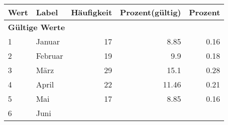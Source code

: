      \begin{longtable}{lXrrr}
     \toprule
     \textbf{Wert} & \textbf{Label} & \textbf{Häufigkeit} & \textbf{Prozent(gültig)} & \textbf{Prozent} \\
     \endhead
     \midrule
     \multicolumn{5}{l}{\textbf{Gültige Werte}}\\

     1 &
     \multicolumn{1}{X}{ Januar   } &


       \num{17} &
       \num[round-mode=places,round-precision=2]{8,85} &
         \num[round-mode=places,round-precision=2]{0,16} \\

     2 &
     \multicolumn{1}{X}{ Februar   } &


       \num{19} &
       \num[round-mode=places,round-precision=2]{9,9} &
         \num[round-mode=places,round-precision=2]{0,18} \\

     3 &
     \multicolumn{1}{X}{ März   } &


       \num{29} &
       \num[round-mode=places,round-precision=2]{15,1} &
         \num[round-mode=places,round-precision=2]{0,28} \\

     4 &
     \multicolumn{1}{X}{ April   } &


       \num{22} &
       \num[round-mode=places,round-precision=2]{11,46} &
         \num[round-mode=places,round-precision=2]{0,21} \\

     5 &
     \multicolumn{1}{X}{ Mai   } &


       \num{17} &
       \num[round-mode=places,round-precision=2]{8,85} &
         \num[round-mode=places,round-precision=2]{0,16} \\

     6 &
     \multicolumn{1}{X}{ Juni   } &



\end{longtable}

